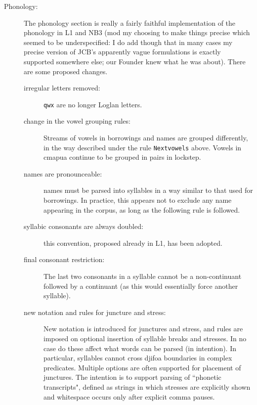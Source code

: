 \documentclass[12pt]{article}
\begin{document}
\begin{description}

\item[Phonology:]  

The phonology section is really a fairly faithful implementation of the phonology in L1 and NB3 (mod my choosing to make things precise which seemed to be underspecified:  I do add though that in many cases my precise version of JCB's apparently vague formulations is exactly supported somewhere else; our Founder knew what he was about).  There are some proposed changes.

\begin{description}

\item[irregular letters removed:]  {\tt qwx} are no longer Loglan letters.

\item[change in the vowel grouping rules:]  Streams of vowels in borrowings and names are grouped differently,
in the way described under the rule {\tt Nextvowels} above.  Vowels in cmapua continue to be grouped in pairs in lockstep.

\item[names are pronounceable:]  names must be parsed into syllables in a way similar to that used for borrowings.  In practice, this appears not to exclude any name appearing in the corpus, as long as the following rule is followed.

\item[syllabic consonants are always doubled:]  this convention, proposed already in L1, has been adopted.

\item[final consonant restriction:]  The last two consonants in a syllable cannot be a non-continuant followed by a continuant (as this would essentially force another syllable).

\item[new notation and rules for juncture and stress:]  New notation is introduced for junctures and stress, and rules are imposed on optional insertion of syllable breaks and stresses.  In no case do these affect what words can be parsed (in intention).   In particular, syllables cannot cross djifoa boundaries in complex predicates.  Multiple options are often supported for placement of junctures.  The intention is to support parsing of ``phonetic transcripts", defined
as strings in which stresses are explicitly shown and whitespace occurs only after explicit comma pauses.


\end{description}
\end{description}
\end{document}

